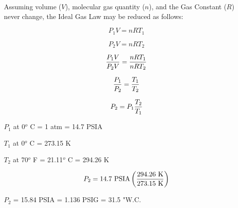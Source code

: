 
Assuming volume ($V$), molecular gas quantity ($n$), and the Gas Constant ($R$) never change, the Ideal Gas Law may be reduced as follows:

$$P_1V = nRT_1$$

$$P_2V = nRT_2$$

$${P_1V \over P_2V} = {nRT_1 \over nRT_2}$$

$${P_1 \over P_2} = {T_1 \over T_2}$$

$$P_2 = P_1 {T_2 \over T_1}$$

\vskip 10pt

$P_1$ at 0$^{o}$ C = 1 atm = 14.7 PSIA

$T_1$ at 0$^{o}$ C = 273.15 K

$T_2$ at 70$^{o}$ F = 21.11$^{o}$ C = 294.26 K

\vskip 10pt

$$P_2 = 14.7 \hbox{ PSIA} \left({294.26 \hbox{ K} \over 273.15 \hbox{ K}}\right)$$

\vskip 10pt

$P_2$ = 15.84 PSIA = 1.136 PSIG = 31.5 "W.C.











